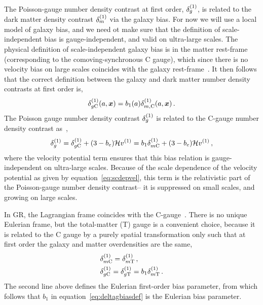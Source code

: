 The Poisson-gauge number density contrast at first order, $\delta_g^{(1)}$, is related to the dark matter density contrast $\delta_m^{(1)}$ via the galaxy bias. For now we will use a local model of galaxy bias, and we need ot make sure that the definition of scale-independent bias is gauge-independent, and valid on ultra-large scales. The physical definition of scale-independent galaxy bias is in the matter rest-frame (corresponding to the comoving-synchronous C gauge), which since there is no velocity bias on large scales coincides with the galaxy rest-frame~\cite{Challinor:2011bk,Bruni:2011ta,Jeong:2011as}. It then follows that the correct definition between the galaxy and dark matter number density contrasts at first order is, 
\begin{equation}\label{eq:deltagbiasdef}
	\delta_{g\mathrm{C}}^{(1)} (a, \bm {x}) = b_1(a) \delta_{m,\mathrm{C}}^{(1)}(a,\bm {x})\,.
\end{equation}
The Poisson gauge number density contrast $\delta_g^{(1)}$ is related to the C-gauge number density contrast as~\cite{Challinor:2011bk}, 
\begin{equation}
	\delta_{g}^{(1)} = \delta_{g\mathrm{C}}^{(1)} + (3 - b_e)\mathcal{H} v^{(1)} = b_1 \delta_{m\mathrm{C}}^{(1)} + (3 - b_e) \mathcal{H} v^{(1)}\,,
\end{equation}
where the velocity potential term ensures that this bias relation is gauge-independent on ultra-large scales. Because of the scale dependence of the velocity potential as given by equation~\eqref{eq:scdepvel}, this term is the relativistic part of the Poisson-gauge number density contrast-- it is suppressed on small scales, and growing on large scales. 

In GR, the Lagrangian frame coincides with the C-gauge~\cite{Villa:2015ppa,Bertacca:2015mca}. There is no unique Eulerian frame, but the total-matter (T) gauge is a convenient choice, because it is related to the C gauge by a purely spatial transformation only such that at first order the galaxy and matter overdensities are the same,~\cite{Bertacca:2015mca}
\begin{align}
	&\delta^{(1)}_{m\mathrm{C}} = \delta^{(1)}_{m\mathrm{T}}\,,\\
	&\delta^{(1)}_{g\mathrm{C}} = \delta^{(1)}_{g\mathrm{T}} = b_1 \delta^{(1)}_{m\mathrm{T}}\,.
\end{align}
The second line above defines the Eulerian first-order bias parameter, from which follows that $b_1$ in equation~\eqref{eq:deltagbiasdef} is the Eulerian bias parameter.

